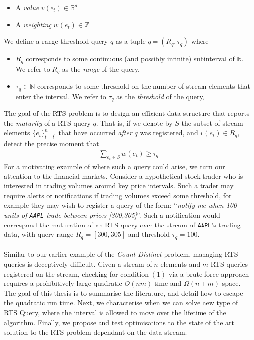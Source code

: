 \begin{itemize}
    \item A \textit{value} $v(e_t)\in\mathbb{R}^d$
    \item A \textit{weighting} $w(e_t)\in\mathbb{Z}$
\end{itemize}
We define a range-threshold query $q$ as a tuple $q = (R_q, \tau_q)$ where 
\begin{itemize}
    \item $R_q$ corresponds to some continuous (and possibly infinite) subinterval of $\mathbb{R}$. We refer to $R_q$ as the \textit{range} of the query. 
    \item $\tau_q \in\mathbb{N}$ corresponds to some threshold on the number of stream elements that enter the interval. We refer to $\tau_q$ as the \textit{threshold} of the query,
\end{itemize}
The goal of the RTS problem is to design an efficient data structure that reports the \textit{maturity} of a RTS query $q$. That is, if we denote by $S$ the subset of stream elements $\{e_t\}_{t=t^\prime}^{n}$ that have occurred \textit{after} $q$ was registered, and $v(e_t) \in R_{q}$, detect the precise moment that
\begin{align}
    \sum_{e_t \in S} w(e_t) \geq \tau_q
\end{align}
For a motivating example of where such a query could arise, we turn our attention to the financial markets. Consider a hypothetical stock trader who is interested in trading volumes around key price intervals. Such a trader may require alerts or notifications if trading volumes exceed some threshold, for example they may wish to register a query of the form: ``\textit{notify me when 100 units of \texttt{AAPL} trade between prices [300,305]}''. Such a notification would correspond the maturation of an RTS query over the stream of \texttt{AAPL}'s trading data, with query range $R_q = [300,305]$ and threshold $\tau_q = 100$. \\
\\
Similar to our earlier example of the \textit{Count Distinct} problem, managing RTS queries is deceptively difficult. Given a stream of $n$ elements and $m$ RTS queries registered on the stream, checking for condition $(1)$ via a brute-force approach requires a prohibitively large quadratic $O(nm)$ time and $\Omega(n+m)$ space. The goal of this thesis is to summarise the literature, and detail how to escape the quadratic run time. Next, we characterise when we can solve new type of RTS Query, where the interval is allowed to move over the lifetime of the algorithm. Finally, we propose and test optimisations to the state of the art solution to the RTS problem dependant on the data stream.

